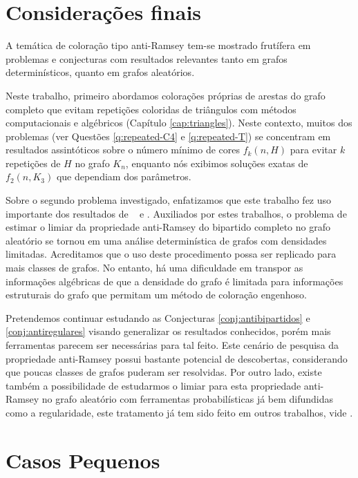 \documentclass[12pt,a4paper]{book}
\begin{document}
\chapter[Considerações finais]{Considerações finais}
\label{cap:conclusao}

A temática de coloração tipo anti-Ramsey tem-se mostrado frutífera em  problemas e conjecturas
com resultados relevantes tanto em grafos determinísticos, quanto em grafos aleatórios. 

Neste trabalho, primeiro abordamos colorações próprias de arestas do grafo completo que evitam repetições coloridas de triângulos com métodos computacionais e algébricos (Capítulo \ref{cap:triangles}).
Neste contexto, muitos dos problemas (ver Questões \ref{q:repeated-C4} e \ref{q:repeated-T}) se concentram em resultados assintóticos sobre o número mínimo de cores $f_k(n,H)$ para evitar $k$ repetições de $H$ no grafo $K_n$, enquanto nós exibimos soluções exatas de $f_2(n,K_3)$ que dependiam dos parâmetros.


Sobre o segundo problema investigado, enfatizamos que este trabalho fez uso importante dos resultados de %
~\cite{NePeSkSt14} 
e \cite{behague2024thresholds}. 
Auxiliados por estes trabalhos, o problema de estimar o limiar da propriedade anti-Ramsey do bipartido completo no grafo aleatório se tornou em uma análise determinística de grafos com densidades limitadas. 
Acreditamos que o uso deste procedimento possa ser replicado para mais classes de grafos. 
No entanto, há uma dificuldade em transpor as informações algébricas de que a densidade do grafo é limitada para informações estruturais do grafo que permitam um método de coloração engenhoso.

Pretendemos continuar estudando as Conjecturas \ref{conj:antibipartidos} e \ref{conj:antiregulares} visando generalizar os resultados conhecidos, porém mais ferramentas parecem ser necessárias para tal feito. 
Este cenário de pesquisa da propriedade anti-Ramsey possui bastante potencial de descobertas, considerando que poucas classes de grafos puderam ser resolvidas.
Por outro lado, existe também a possibilidade de estudarmos o limiar para esta propriedade anti-Ramsey no grafo aleatório com ferramentas probabilísticas já bem difundidas como a regularidade, este tratamento já tem sido feito em outros trabalhos, vide \cite{KoKoMo12,araujo2022anti, aigner2022large}.

\appendix
\chapter{Casos Pequenos}\label{cap:app}
\end{document}
